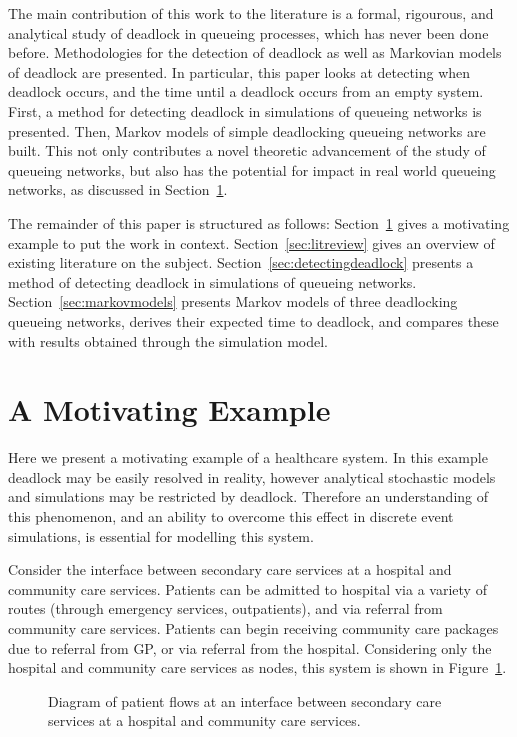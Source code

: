 \documentclass{article}
\numberwithin{equation}{section}
\begin{document}
The main contribution of this work to the literature is a formal, rigourous, and
analytical study of deadlock in queueing processes, which has never been done
before.
Methodologies for the detection of deadlock as well as Markovian models of
deadlock are presented.
In particular, this paper looks at detecting when deadlock occurs, and the time
until a deadlock occurs from an empty system.
First, a method for detecting deadlock in simulations of queueing networks is
presented.
Then, Markov models of simple deadlocking queueing networks are built.
This not only contributes a novel theoretic advancement of the study of queueing
networks, but also has the potential for impact in real world queueing networks,
as discussed in Section~\ref{sec:motivatingexample}.

The remainder of this paper is structured as follows:
Section~\ref{sec:motivatingexample} gives a motivating example to put the work
in context.
Section~\ref{sec:litreview} gives an overview of existing literature on the
subject.
Section~\ref{sec:detectingdeadlock} presents a method of detecting deadlock in
simulations of queueing networks.
Section~\ref{sec:markovmodels} presents Markov models of three deadlocking
queueing networks, derives their expected time to deadlock, and compares these
with results obtained through the simulation model.


\section{A Motivating Example}\label{sec:motivatingexample}

Here we present a motivating example of a healthcare system.
In this example deadlock may be easily resolved in reality, however analytical
stochastic models and simulations may be restricted by deadlock.
Therefore an understanding of this phenomenon, and an ability to overcome
this effect in discrete event simulations, is essential for modelling this
system.

Consider the interface between secondary care services at a hospital and
community care services.
Patients can be admitted to hospital via a variety of routes (through
emergency services, outpatients), and via referral from community care
services.
Patients can begin receiving community care packages due to referral from GP,
or via referral from the hospital.
Considering only the hospital and community care services as nodes, this
system is shown in Figure~\ref{fig:motivatingexample}.

\begin{figure}
\begin{center}

\end{center}
\caption{Diagram of patient flows at an interface between secondary care
services at a hospital and community care services.}
\label{fig:motivatingexample}
\end{figure}
\end{document}

